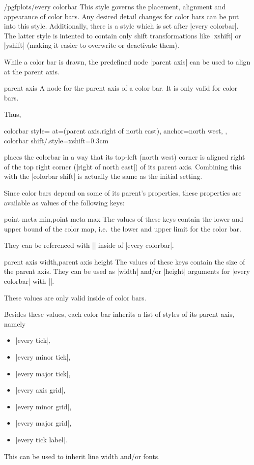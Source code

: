\begin{stylekey}{/pgfplots/every colorbar}
	This style governs the placement, alignment and appearance of color bars. Any desired detail changes for color bars can be put into this style. Additionally, there is a style  which is set after |every colorbar|. The latter style is intented to contain only shift transformations like |xshift| or |yshift| (making it easier to overwrite or deactivate them).

	While a color bar is drawn, the predefined node |parent axis| can be used to align at the parent axis.
\begin{predefinednode}{parent axis}
	A node for the parent axis of a color bar. It is only valid for color bars.
\end{predefinednode}

	Thus, 
\begin{codeexample}
colorbar style={
	at={(parent axis.right of north east)},
	anchor=north west,
},
colorbar shift/.style={xshift=0.3cm}
\end{codeexample}
	\noindent places the colorbar in a way that its top-left (north west) corner is aligned right of the top right corner (|right of north east|) of its parent axis. Combining this with the |colorbar shift| is actually the same as the initial setting.

	Since color bars depend on some of its parent's properties, these properties are available as values of the following keys:
\begin{pgfplotskeylist}{point meta min,point meta max}
	The values of these keys contain the lower and upper bound of the color map, i.e.\ the lower and upper limit for the color bar. 
	
	They can be referenced with || inside of |every colorbar|.
\end{pgfplotskeylist}
\begin{pgfplotskeylist}{parent axis width,parent axis height}
	The values of these keys contain the size of the parent axis. They can be used as |width| and/or |height| arguments for |every colorbar| with ||.

	These values are only valid inside of color bars.
\end{pgfplotskeylist}

	Besides these values, each color bar inherits a list of styles of its parent axis, namely

	\begin{itemize}
		\item |every tick|,
		\item |every minor tick|,
		\item |every major tick|,
		\item |every axis grid|,
		\item |every minor grid|,
		\item |every major grid|,
		\item |every tick label|.
	\end{itemize}
	This can be used to inherit line width and/or fonts.


\end{stylekey}
